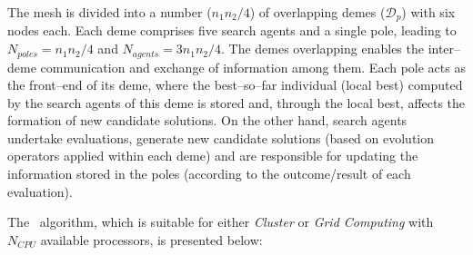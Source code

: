 \documentclass{vki_ls}
\def\Dp{\mathcal{D}_p}
\begin{document}
The mesh is divided into a number ($n_1 n_2 / 4$) of overlapping demes ($\Dp$) with six nodes each. Each deme comprises five search agents and a single pole, leading to $N_{poles}\!=n_1n_2/4$ and $N_{agents}\!=\!3n_1n_2/4$.
The demes overlapping enables the inter--deme communication and exchange of information among them.
Each pole acts as the front--end of its deme, where the best--so--far individual (local best) computed by the search agents of this deme is stored and, through the local best, affects the formation of new candidate solutions. 
On the other hand, search agents undertake evaluations, generate new candidate solutions (based on evolution operators applied within each deme) and are responsible for updating the information stored in the poles (according to the outcome/result of each evaluation).

The \AEA\ algorithm, which is suitable for either \textit{Cluster} or \textit{Grid Computing} with $N_{CPU}$ available processors, is presented below:
\end{document}
